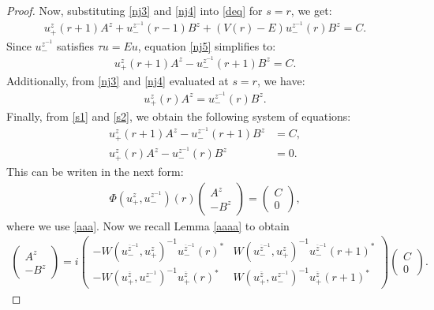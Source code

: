 \documentclass[10pt,a4paper]{amsart}
\begin{document}
\begin{proof}
Now, substituting \eqref{nj3} and \eqref{nj4} into \eqref{deq} for \(s = r\), we get:
\begin{align}\label{nj5}
     u_{+}^{z}(r+1) A^{z} + u_{-}^{z^{-1}}(r-1) B^{z} + (V(r) - E) u_{-}^{z^{-1}}(r) B^{z} = C.
\end{align}
Since \(u_{-}^{z^{-1}}\) satisfies \(\tau u = Eu \), equation \eqref{nj5} simplifies to:
\begin{align}\label{s1}
     u_{+}^{z}(r+1) A^{z} - u_{-}^{z^{-1}}(r+1) B^{z} = C.
\end{align}
Additionally, from \eqref{nj3} and \eqref{nj4} evaluated at \(s = r\), we have:
\begin{align}\label{s2}
     u_{+}^{z}(r) A^{z} = u_{-}^{z^{-1}}(r) B^{z}.
\end{align}
Finally, from \eqref{s1} and \eqref{s2}, we obtain the following system of equations:
\begin{align}
     u_{+}^{z}(r+1) A^{z} - u_{-}^{z^{-1}}(r+1) B^{z} &= C, \\
     u_{+}^{z}(r) A^{z} - u_{-}^{z^{-1}}(r) B^{z} &= 0 .
\end{align}
This can be writen in the next form: 
\begin{align}
    \Phi ( u_{+}^{z}, u_{-}^{z^{-1}})(r)
    \begin{pmatrix}
        A^{z}\\
        -B^{z}
         \end{pmatrix}=
          \begin{pmatrix}
        C\\
        0
         \end{pmatrix},
\end{align}
where we use \eqref{aaa}.  Now we recall  Lemma \ref{aaaa} to obtain
\begin{align}
    \begin{pmatrix}
        A^{z}\\
       - B^{z}
         \end{pmatrix}= i\begin{pmatrix}
           -W(u_- ^{\overline{z}^{-1}}, u_+^{z})^{-1}u_- ^{\overline{z}^{-1}}(r)^{*} & W(u_- ^{\overline{z}^{-1}}, u_+^{z})^{-1}u_- ^{\overline{z}^{-1}}(r+1)^{*} \\
           -W(u_+ ^{\overline{z}}, u_-^{z^{-1}})^{-1}u_+ ^{\overline{z}}(r)^{*} & W(u_+ ^{\overline{z}}, u_-^{z^{-1}})^{-1}u_+ ^{\overline{z}}(r+1)^{*}
        \end{pmatrix} \begin{pmatrix}
        C\\
        0
         \end{pmatrix}.
\end{align}


\end{proof}
\end{document}
